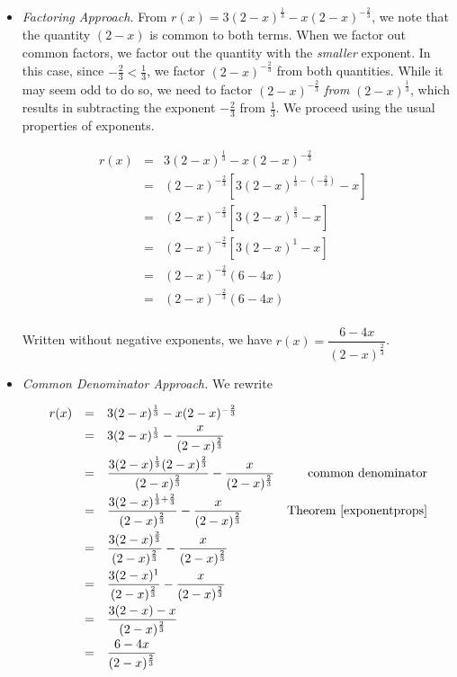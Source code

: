 \begin{ex}
\begin{enumerate}
\begin{itemize}

\item  \textit{Factoring Approach.}  From $r(x) = 3 (2-x)^{\frac{1}{3}} - x (2-x)^{-\frac{2}{3}}$, we note that the quantity $(2-x)$ is common to both terms.  When we factor out common factors, we factor out the quantity with the \textit{smaller} exponent.  In this case, since $-\frac{2}{3} < \frac{1}{3}$, we factor $(2-x)^{-\frac{2}{3}}$ from both quantities.  While it may seem odd to do so, we need to factor $(2-x)^{-\frac{2}{3}}$ \textit{from} $(2-x)^{\frac{1}{3}}$, which results in subtracting the exponent $-\frac{2}{3}$ from $\frac{1}{3}$.  We proceed using the usual properties of exponents.

\[ \begin{array}{rclr}

r(x)  & = & 3 (2-x)^{\frac{1}{3}} - x (2-x)^{-\frac{2}{3}} & \\ [3pt]
      & = & (2-x)^{-\frac{2}{3}} \left[ 3 (2-x)^{\frac{1}{3} - \left(-\frac{2}{3}\right)} - x\right] & \\ [6pt]
      & = & (2-x)^{-\frac{2}{3}}\left[3(2-x)^{\frac{3}{3}} - x\right] & \\ [3pt]
      & = & (2-x)^{-\frac{2}{3}}\left[3(2-x)^{1} - x\right] &  \\ [3pt]
      & = & (2-x)^{-\frac{2}{3}}\left(6-4x\right) & \\ [3pt]
      & = & (2-x)^{-\frac{2}{3}}\left(6-4x\right) & \\
      
\end{array}\]

Written without negative exponents, we have $r(x) = \dfrac{6-4x}{(2-x)^{\frac{2}{3}}}$.

\newpage

\item \textit{Common Denominator Approach.}  We rewrite 

\[ \begin{array}{rclr}

r(x)  & = & 3 (2-x)^{\frac{1}{3}} - x (2-x)^{-\frac{2}{3}} & \\ [3pt]
      & = & 3 (2-x)^{\frac{1}{3}} - \dfrac{x}{(2-x)^{\frac{2}{3}}} & \\ [10pt]
      & = & \dfrac{3 (2-x)^{\frac{1}{3}}(2-x)^{\frac{2}{3}}}{(2-x)^{\frac{2}{3}}} - \dfrac{x}{(2-x)^{\frac{2}{3}}} & \text{common denominator} \\ [10pt]
      & = & \dfrac{3 (2-x)^{\frac{1}{3} + \frac{2}{3}}}{(2-x)^{\frac{2}{3}}} - \dfrac{x}{(2-x)^{\frac{2}{3}}} & \text{Theorem \ref{exponentprops}}  \\ [10pt]
      & = & \dfrac{3 (2-x)^{\frac{3}{3}}}{(2-x)^{\frac{2}{3}}} - \dfrac{x}{(2-x)^{\frac{2}{3}}} & \\ [10pt]
      & = & \dfrac{3 (2-x)^1}{(2-x)^{\frac{2}{3}}} - \dfrac{x}{(2-x)^{\frac{2}{3}}} &  \\ [10pt]
      & = & \dfrac{3 (2-x) - x}{(2-x)^{\frac{2}{3}}} & \\ [10pt]
      & = & \dfrac{6-4x}{(2-x)^{\frac{2}{3}}} & \\


\end{array}\]
\end{itemize}
\end{enumerate}
\end{ex}
